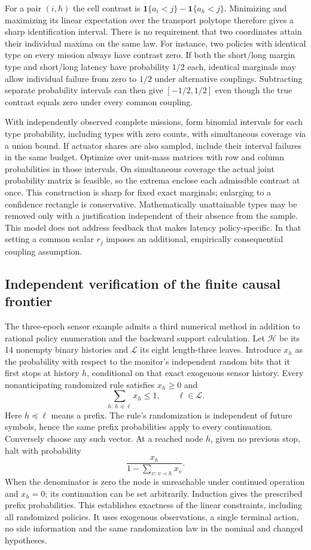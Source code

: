 For a pair $(i,h)$ the cell contrast is $\mathbf1\{a_i<j\}-\mathbf1\{a_h<j\}$. Minimizing and maximizing its linear expectation over the transport polytope therefore gives a sharp identification interval. There is no requirement that two coordinates attain their individual maxima on the same law. For instance, two policies with identical type on every mission always have contrast zero. If both the short/long margin type and short/long latency have probability $1/2$ each, identical marginals may allow individual failure from zero to $1/2$ under alternative couplings. Subtracting separate probability intervals can then give $[-1/2,1/2]$ even though the true contrast equals zero under every common coupling.

With independently observed complete missions, form binomial intervals for each type probability, including types with zero counts, with simultaneous coverage via a union bound. If actuator shares are also sampled, include their interval failures in the same budget. Optimize over unit-mass matrices with row and column probabilities in those intervals. On simultaneous coverage the actual joint probability matrix is feasible, so the extrema enclose each admissible contrast at once. This construction is sharp for fixed exact marginals; enlarging to a confidence rectangle is conservative. Mathematically unattainable types may be removed only with a justification independent of their absence from the sample. This model does not address feedback that makes latency policy-specific. In that setting a common scalar $r_j$ imposes an additional, empirically consequential coupling assumption.

\subsection{Independent verification of the finite causal frontier}
The three-epoch sensor example admits a third numerical method in addition to rational policy enumeration and the backward support calculation. Let $\mathcal H$ be its 14 nonempty binary histories and $\mathcal L$ its eight length-three leaves. Introduce $x_h$ as the probability with respect to the monitor's independent random bits that it first stops at history $h$, conditional on that exact exogenous sensor history. Every nonanticipating randomized rule satisfies $x_h\ge0$ and
\[
 \sum_{h:\,h\preceq \ell} x_h\le1,\qquad \ell\in\mathcal L.
\]
Here $h\preceq\ell$ means a prefix. The rule's randomization is independent of future symbols, hence the same prefix probabilities apply to every continuation. Conversely choose any such vector. At a reached node $h$, given no previous stop, halt with probability
\[
 \frac{x_h}{1-\sum_{v:\,v\prec h} x_v}.
\]
When the denominator is zero the node is unreachable under continued operation and $x_h=0$; its continuation can be set arbitrarily. Induction gives the prescribed prefix probabilities. This establishes exactness of the linear constraints, including all randomized policies. It uses exogenous observations, a single terminal action, no side information and the same randomization law in the nominal and changed hypotheses.

